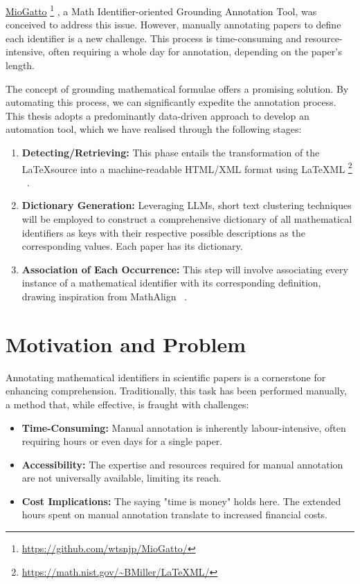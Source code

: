 \href{https://github.com/wtsnjp/MioGatto/tree/main}{MioGatto} \footnote{\url{https://github.com/wtsnjp/MioGatto/}} \citep{asakura2021miogatto}, a Math Identifier-oriented Grounding Annotation Tool, was conceived to address this issue. However, manually annotating papers to define each identifier is a new challenge. This process is time-consuming and resource-intensive, often requiring a whole day for annotation, depending on the paper's length.

The concept of grounding mathematical formulae \citep{asakura2020towards} offers a promising solution. By automating this process, we can significantly expedite the annotation process. This thesis adopts a predominantly data-driven approach to develop an automation tool, which we have realised through the following stages:

\begin{enumerate}
    \item \textbf{Detecting/Retrieving:} This phase entails the transformation of the \LaTeX \space source into a machine-readable HTML/XML format using \LaTeX ML \footnote{\url{https://math.nist.gov/~BMiller/LaTeXML/}} ~\citep{ginev2011latexml}.
    
    \item \textbf{Dictionary Generation:} Leveraging \ac{LLMs}, short text clustering techniques will be employed to construct a comprehensive dictionary of all mathematical identifiers as keys with their respective possible descriptions as the corresponding values. Each paper has its dictionary.
    
    \item \textbf{Association of Each Occurrence:} This step will involve associating every instance of a mathematical identifier with its corresponding definition, drawing inspiration from MathAlign ~\citep{alexeeva2020mathalign}.
\end{enumerate}


\section{Motivation and Problem}

Annotating mathematical identifiers in scientific papers is a cornerstone for enhancing comprehension. Traditionally, this task has been performed manually, a method that, while effective, is fraught with challenges:

\begin{itemize}
    \item \textbf{Time-Consuming:} Manual annotation is inherently labour-intensive, often requiring hours or even days for a single paper.
    
    \item \textbf{Accessibility:} The expertise and resources required for manual annotation are not universally available, limiting its reach.
    
    \item \textbf{Cost Implications:} The saying "time is money" holds here. The extended hours spent on manual annotation translate to increased financial costs.
\end{itemize}

